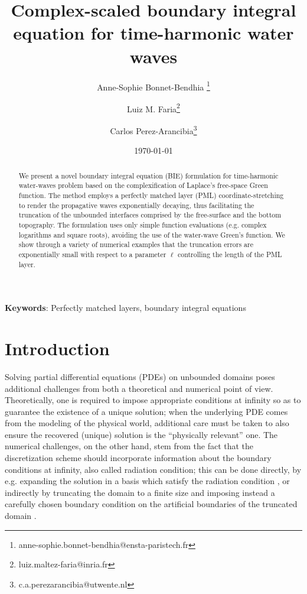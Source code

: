 \documentclass[11pt]{article}
\title{Complex-scaled boundary integral equation for time-harmonic water waves}
\author[1]{Anne-Sophie Bonnet-Bendhia \thanks{anne-sophie.bonnet-bendhia@ensta-paristech.fr}}
\author[1]{Luiz M. Faria\thanks{luiz.maltez-faria@inria.fr}}
\author[2]{Carlos Perez-Arancibia\thanks{c.a.perezarancibia@utwente.nl}}
\affil[1]{\small{Laboratoire POEMS, CNRS/ENSTA/INRIA, France}}
\affil[2]{\small{Univeristy of Twente, Netherlands}}
\date{\today}
\begin{document}
\maketitle

\begin{abstract}  
  We present a novel boundary integral equation (BIE) formulation for
  time-harmonic water-waves problem based on the complexification of Laplace's
  free-space Green function. The method employs a perfectly matched layer (PML)
  coordinate-stretching to render the propagative waves exponentially decaying,
  thus facilitating the truncation of the unbounded interfaces comprised by the
  free-surface and the bottom topography. The formulation uses only simple
  function evaluations (e.g. complex logarithms and square roots), avoiding the
  use of the water-wave Green’s function. We show through a variety of numerical
  examples that the truncation errors are exponentially small with respect to a
  parameter $\ell$ controlling the length of the PML layer.
\end{abstract}

 \textbf{Keywords}: Perfectly matched layers, boundary integral equations \\


\tableofcontents

\section{Introduction}

Solving partial differential equations (PDEs) on unbounded domains poses
additional challenges from both a theoretical and numerical point of view.
Theoretically, one is required to impose appropriate conditions at infinity so
as to guarantee the existence of a unique solution; when the underlying PDE
comes from the modeling of the physical world, additional care must be taken to
also ensure the recovered (unique) solution is the ``physically relevant'' one.
The numerical challenges, on the other hand, stem from the fact that the
discretization scheme should incorporate information about the boundary
conditions at infinity, also called radiation condition; this can be done
directly, by e.g. expanding the solution in a basis which satisfy the radiation
condition \cite{?}, or indirectly by truncating the domain to a finite size and
imposing instead a carefully chosen boundary condition on the artificial
boundaries of the truncated domain \cite{?}.
\end{document}
